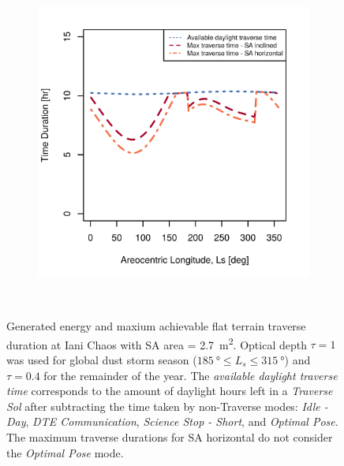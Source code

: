 \begin{figure}[h]
\begin{subfigure}[t]{\subfigureWidth}
        \includegraphics[height=\graphicsHeight]{sections/design/solar-array/plots/ianichaos-75w-max-traverse-durations-for-sa-area-27m2.png}
		\label{fig:plot:sub:iani-chaos-max-traverse-durations}
	\end{subfigure}\\[0.8ex]
    \caption[Generated energy and maxium achievable flat terrain traverse durations at Iani Chaos]
            {Generated energy and maxium achievable flat terrain traverse duration at Iani Chaos with \ac{SA} area = \SI{2.7}{m^{2}}. Optical depth  $\tau = 1$ was used for global dust storm season ($\SI{185}{\degree} \leq L_{s} \leq \SI{315}{\degree}$) and $\tau = 0.4$ for the remainder of the year. The \textit{available daylight traverse time} corresponds to the amount of daylight hours left in a \textit{Traverse Sol} after subtracting the time taken by non-Traverse modes: \textit{Idle - Day}, \textit{\ac{DTE} Communication}, \textit{Science Stop - Short}, and \textit{Optimal Pose}. The maximum traverse durations for \ac{SA} horizontal do not consider the \textit{Optimal Pose} mode.}
    \label{fig:plot:iani-chaos-generated-energy-and-max-traverse-durations}
\vspace{-2ex}
\end{figure}

